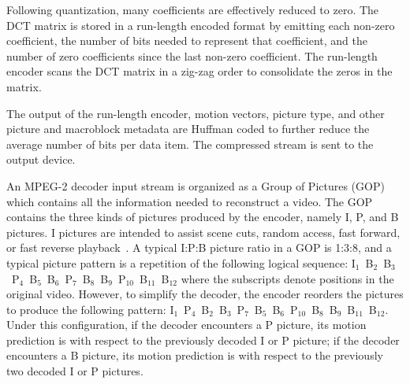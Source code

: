 
Following quantization, many coefficients are effectively reduced to
zero. The DCT matrix is stored in a run-length encoded format by emitting each 
non-zero coefficient, the number of bits needed to represent that coefficient, 
and the number of zero coefficients since the last non-zero coefficient. The
run-length encoder scans the DCT matrix in a zig-zag order
to consolidate the zeros in the matrix.

The output of the run-length encoder, motion vectors, picture type,
and other picture and macroblock metadata are Huffman coded to
further reduce the average number of bits per data item. The compressed
stream is sent to the output device.


An MPEG-2 decoder input stream is organized as a Group of Pictures
(GOP) which contains all the information needed to reconstruct a
video. The GOP contains the three kinds of pictures produced by the
encoder, namely I, P, and B pictures. I pictures are intended to
assist scene cuts, random access, fast forward, or fast reverse
playback~\cite[p. 14]{MPEG2}. A typical I:P:B picture ratio in a GOP
is 1:3:8, and a typical picture pattern is a repetition of the
following logical sequence:
I$_1$~B$_2$~B$_3$~P$_4$~B$_5$~B$_6$~P$_7$~B$_8$~B$_9$~P$_{10}$~B$_{11}$~B$_{12}$
where the subscripts denote positions in the original video.  However,
to simplify the decoder, the encoder reorders the pictures to produce
the following pattern:
I$_1$~P$_4$~B$_2$~B$_3$~P$_7$~B$_5$~B$_6$~P$_{10}$~B$_8$~B$_9$~B$_{11}$~B$_{12}$.
Under this configuration, if the decoder encounters a P picture, its
motion prediction is with respect to the previously decoded I or P
picture; if the decoder encounters a B picture, its motion prediction
is with respect to the previously two decoded I or P pictures.

